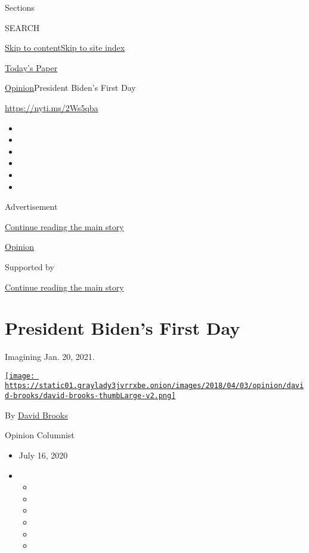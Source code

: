 Sections

SEARCH

\protect\hyperlink{site-content}{Skip to
content}\protect\hyperlink{site-index}{Skip to site index}

\href{https://myaccount.nytimes3xbfgragh.onion/auth/login?response_type=cookie\&client_id=vi}{}

\href{https://www.nytimes3xbfgragh.onion/section/todayspaper}{Today's
Paper}

\href{/section/opinion}{Opinion}\textbar{}President Biden's First Day

\url{https://nyti.ms/2Ws5qba}

\begin{itemize}
\item
\item
\item
\item
\item
\item
\end{itemize}

Advertisement

\protect\hyperlink{after-top}{Continue reading the main story}

\href{/section/opinion}{Opinion}

Supported by

\protect\hyperlink{after-sponsor}{Continue reading the main story}

\hypertarget{president-bidens-first-day}{%
\section{President Biden's First Day}\label{president-bidens-first-day}}

Imagining Jan. 20, 2021.

\href{https://www.nytimes3xbfgragh.onion/by/david-brooks}{\texttt{[image: https://static01.graylady3jvrrxbe.onion/images/2018/04/03/opinion/david-brooks/david-brooks-thumbLarge-v2.png]}}

By \href{https://www.nytimes3xbfgragh.onion/by/david-brooks}{David
Brooks}

Opinion Columnist

\begin{itemize}
\item
  July 16, 2020
\item
  \begin{itemize}
  \item
  \item
  \item
  \item
  \item
  \item
  \end{itemize}
\end{itemize}

